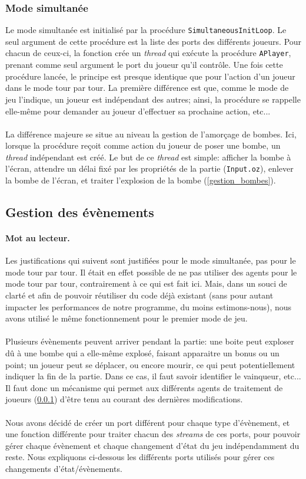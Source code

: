\documentclass{article}
\begin{document}
\subsubsection{Mode simultanée}
\label{simult}
Le mode simultanée est initialisé par la procédure \texttt{SimultaneousInitLoop}. Le seul argument de cette procédure est la liste des ports des différents joueurs. Pour chacun de ceux-ci, la fonction crée un \emph{thread} qui exécute la procédure \texttt{APlayer}, prenant comme seul argument le port du joueur qu'il contrôle. Une fois cette procédure lancée, le principe est presque identique que pour l'action d'un joueur dans le mode tour par tour. La première différence est que, comme le mode de jeu l'indique, un joueur est indépendant des autres; ainsi, la procédure se rappelle elle-même pour demander au joueur d'effectuer sa prochaine action, etc... \\ \\
La différence majeure se situe au niveau la gestion de l'amorçage de bombes. Ici, lorsque la procédure reçoit comme action du joueur de poser une bombe, un \emph{thread} indépendant est créé. Le but de ce \emph{thread} est simple: afficher la bombe à l'écran, attendre un délai fixé par les propriétés de la partie (\texttt{Input.oz}), enlever la bombe de l'écran, et traiter l'explosion de la bombe (\ref{gestion_bombes}).

\subsection{Gestion des évènements}
\paragraph{Mot au lecteur.}Les justifications qui suivent sont justifiées pour le mode simultanée, pas pour le mode tour par tour. Il était en effet possible de ne pas utiliser des agents pour le mode tour par tour, contrairement à ce qui est fait ici. Mais, dans un souci de clarté et afin de pouvoir réutiliser du code déjà existant (sans pour autant impacter les performances de notre programme, du moins estimons-nous), nous avons utilisé le même fonctionnement pour le premier mode de jeu. \\ \\
Plusieurs évènements peuvent arriver pendant la partie: une boite peut exploser dû à une bombe qui a elle-même explosé, faisant apparaitre un bonus ou un point; un joueur peut se déplacer, ou encore mourir, ce qui peut potentiellement indiquer la fin de la partie. Dans ce cas, il faut savoir identifier le vainqueur, etc... Il faut donc un mécanisme qui permet aux différents agents de traitement de joueurs (\ref{simult}) d'être tenu au courant des dernières modifications. \\ \\
Nous avons décidé de créer un port différent pour chaque type d'évènement, et une fonction différente pour traiter chacun des \emph{streams} de ces ports, pour pouvoir gérer chaque évènement et chaque changement d'état du jeu indépendamment du reste. Nous expliquons ci-dessous les différents ports utilisés pour gérer ces changements d'état/évènements.
\end{document}
